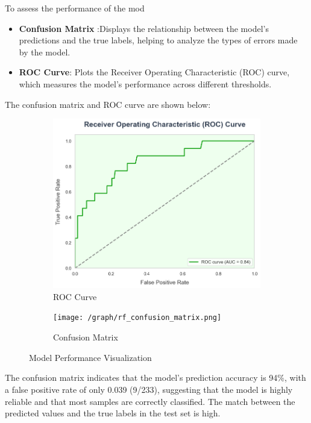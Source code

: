 \documentclass{mcmthesis}
\begin{document}
    To assess the performance of the mod

\begin{itemize}   
    \item {\bf Confusion Matrix} :Displays the relationship between the model's predictions and the true labels, helping to analyze the types of errors made by the model.
    \item {\bf ROC Curve}: Plots the Receiver Operating Characteristic (ROC) curve, which measures the model's performance across different thresholds.
\end{itemize} 

    The confusion matrix and ROC curve are shown below:

\begin{figure}[H]
    \centering
    \begin{subfigure}{0.4\textwidth}
        \centering
        \includegraphics[width=\textwidth]{graph/rf_roc.png}
        \caption{ROC Curve}
        \label{subfig:player1}
    \end{subfigure}
    \hfill
    \begin{subfigure}{0.4\textwidth}
        \centering
        \texttt{[image: /graph/rf\_confusion\_matrix.png]}
        \caption{Confusion Matrix}
        \label{subfig:player2}
    \end{subfigure}
    \caption{Model Performance Visualization}
    \label{Figure 13}
\end{figure}

    The confusion matrix indicates that the model's prediction accuracy is 94\%, with a false positive rate of only 0.039 (9/233), suggesting that the model is highly reliable and that most samples are correctly classified. The match between the predicted values and the true labels in the test set is high.
\end{document}
